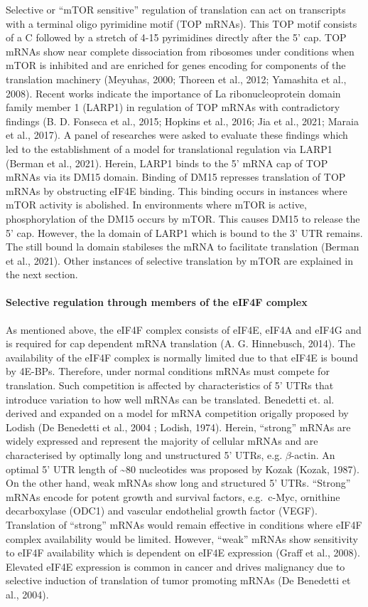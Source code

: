 \documentclass[12pt,openany]{book}
\begin{document}
Selective or ``mTOR sensitive'' regulation of translation can act on
transcripts with a terminal oligo pyrimidine motif (TOP mRNAs). This TOP
motif consists of a C followed by a stretch of 4-15 pyrimidines directly
after the 5' cap. TOP mRNAs show near complete dissociation from
ribosomes under conditions when mTOR is inhibited and are enriched for
genes encoding for components of the translation machinery (Meyuhas,
2000; Thoreen et al., 2012; Yamashita et al., 2008). Recent works
indicate the importance of La ribonucleoprotein domain family member 1
(LARP1) in regulation of TOP mRNAs with contradictory findings (B. D.
Fonseca et al., 2015; Hopkins et al., 2016; Jia et al., 2021; Maraia et
al., 2017). A panel of researches were asked to evaluate these findings
which led to the establishment of a model for translational regulation
via LARP1 (Berman et al., 2021). Herein, LARP1 binds to the 5' mRNA cap
of TOP mRNAs via its DM15 domain. Binding of DM15 represses translation
of TOP mRNAs by obstructing eIF4E binding. This binding occurs in
instances where mTOR activity is abolished. In environments where mTOR
is active, phosphorylation of the DM15 occurs by mTOR. This causes DM15
to release the 5' cap. However, the la domain of LARP1 which is bound to
the 3' UTR remains. The still bound la domain stabileses the mRNA to
facilitate translation (Berman et al., 2021). Other instances of
selective translation by mTOR are explained in the next section.

\paragraph{Selective regulation through members of the eIF4F complex} \label{sel4F}

As mentioned above, the eIF4F complex consists of eIF4E, eIF4A and eIF4G
and is required for cap dependent mRNA translation (A. G. Hinnebusch,
2014). The availability of the eIF4F complex is normally limited due to
that eIF4E is bound by 4E-BPs. Therefore, under normal conditions mRNAs
must compete for translation. Such competition is affected by
characteristics of 5' UTRs that introduce variation to how well mRNAs
can be translated. Benedetti et. al. derived and expanded on a model for
mRNA competition origally proposed by Lodish (De Benedetti et al., 2004
; Lodish, 1974). Herein, ``strong'' mRNAs are widely expressed and
represent the majority of cellular mRNAs and are characterised by
optimally long and unstructured 5' UTRs, e.g. \(\beta\)-actin. An
optimal 5' UTR length of \textasciitilde{}80 nucleotides was proposed by
Kozak (Kozak, 1987). On the other hand, weak mRNAs show long and
structured 5' UTRs. ``Strong'' mRNAs encode for potent growth and
survival factors, e.g.~c-Myc, ornithine decarboxylase (ODC1) and
vascular endothelial growth factor (VEGF). Translation of ``strong''
mRNAs would remain effective in conditions where eIF4F complex
availability would be limited. However, ``weak'' mRNAs show sensitivity
to eIF4F availability which is dependent on eIF4E expression (Graff et
al., 2008). Elevated eIF4E expression is common in cancer and drives
malignancy due to selective induction of translation of tumor promoting
mRNAs (De Benedetti et al., 2004).
\end{document}
